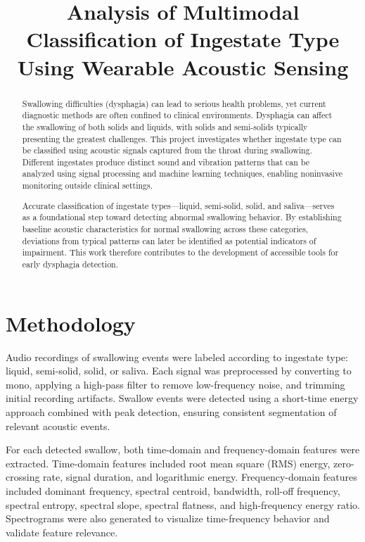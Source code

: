 \documentclass[conference]{IEEEtran}
\begin{document}
\title{Analysis of Multimodal Classification of Ingestate Type Using Wearable Acoustic Sensing}

\author{
}

\maketitle

\begin{abstract}
Swallowing difficulties (dysphagia) can lead to serious health problems, yet current diagnostic methods are often confined to clinical environments. Dysphagia can affect the swallowing of both solids and liquids, with solids and semi-solids typically presenting the greatest challenges. This project investigates whether ingestate type can be classified using acoustic signals captured from the throat during swallowing. Different ingestates produce distinct sound and vibration patterns that can be analyzed using signal processing and machine learning techniques, enabling noninvasive monitoring outside clinical settings.

Accurate classification of ingestate types—liquid, semi-solid, solid, and saliva—serves as a foundational step toward detecting abnormal swallowing behavior. By establishing baseline acoustic characteristics for normal swallowing across these categories, deviations from typical patterns can later be identified as potential indicators of impairment. This work therefore contributes to the development of accessible tools for early dysphagia detection.
\end{abstract}

\section{Methodology}

Audio recordings of swallowing events were labeled according to ingestate type: liquid, semi-solid, solid, or saliva. Each signal was preprocessed by converting to mono, applying a high-pass filter to remove low-frequency noise, and trimming initial recording artifacts. Swallow events were detected using a short-time energy approach combined with peak detection, ensuring consistent segmentation of relevant acoustic events.

For each detected swallow, both time-domain and frequency-domain features were extracted. Time-domain features included root mean square (RMS) energy, zero-crossing rate, signal duration, and logarithmic energy. Frequency-domain features included dominant frequency, spectral centroid, bandwidth, roll-off frequency, spectral entropy, spectral slope, spectral flatness, and high-frequency energy ratio. Spectrograms were also generated to visualize time-frequency behavior and validate feature relevance.
\end{document}
